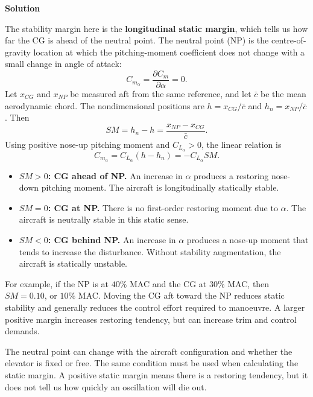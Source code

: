 \documentclass[12pt,a4paper]{article}
\begin{document}
\textbf{Solution}

The stability margin here is the \textbf{longitudinal static margin}, which tells us how far the CG is ahead of the neutral point. The neutral point (NP) is the centre-of-gravity location at which the pitching-moment coefficient does not change with a small change in angle of attack:
\[
C_{m_\alpha}=\frac{\partial C_m}{\partial\alpha}=0.
\]
Let $x_{CG}$ and $x_{NP}$ be measured aft from the same reference, and let $\bar c$ be the mean aerodynamic chord. The nondimensional positions are $h=x_{CG}/\bar c$ and $h_n=x_{NP}/\bar c$. Then
\[
\boxed{SM=h_n-h=\frac{x_{NP}-x_{CG}}{\bar c}.}
\]
Using positive nose-up pitching moment and $C_{L_\alpha}>0$, the linear relation is
\[
\boxed{C_{m_\alpha}=C_{L_\alpha}(h-h_n)=-C_{L_\alpha}SM.}
\]
\begin{center}
\end{center}
\begin{itemize}
\item \textbf{$SM>0$: CG ahead of NP.} An increase in $\alpha$ produces a restoring nose-down pitching moment. The aircraft is longitudinally statically stable.
\item \textbf{$SM=0$: CG at NP.} There is no first-order restoring moment due to $\alpha$. The aircraft is neutrally stable in this static sense.
\item \textbf{$SM<0$: CG behind NP.} An increase in $\alpha$ produces a nose-up moment that tends to increase the disturbance. Without stability augmentation, the aircraft is statically unstable.
\end{itemize}
For example, if the NP is at $40\%$ MAC and the CG at $30\%$ MAC, then $SM=0.10$, or $10\%$ MAC. Moving the CG aft toward the NP reduces static stability and generally reduces the control effort required to manoeuvre. A larger positive margin increases restoring tendency, but can increase trim and control demands.

The neutral point can change with the aircraft configuration and whether the elevator is fixed or free. The same condition must be used when calculating the static margin. A positive static margin means there is a restoring tendency, but it does not tell us how quickly an oscillation will die out.
\newpage
\end{document}

